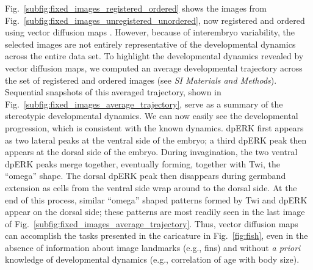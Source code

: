 \documentclass{pnastwo}
\newcommand{\SI}[0]{{\it SI Materials and Methods}}
\newcommand{\fig}[0]{Fig.}
\begin{document}
\begin{article}
\fig~\ref{subfig:fixed_images_registered_ordered} shows the images from \fig~\ref{subfig:fixed_images_unregistered_unordered}, now registered and ordered using vector diffusion maps \cite{singer2012vector}.
%
However, because of interembryo variability, the selected images are not entirely representative of the developmental dynamics across the entire data set.
%
To highlight the developmental dynamics revealed by vector diffusion maps, we computed an average developmental trajectory across the set of registered and ordered images (see \SI). 
%
Sequential snapshots of this averaged trajectory, shown in \fig~\ref{subfig:fixed_images_average_trajectory}, serve as a summary of the stereotypic developmental dynamics.
%
We can now easily see the developmental progression, which is consistent with the known dynamics. 
%
dpERK first appears as two lateral peaks at the ventral side of the embryo; a third dpERK peak then appears at the dorsal side of the embryo.
%
During invagination, the two ventral dpERK peaks merge together, eventually forming, together with Twi, the ``omega'' shape.
%
The dorsal dpERK peak then disappears during germband extension as cells from the ventral side wrap around to the dorsal side.
%
At the end of this process, similar ``omega'' shaped patterns formed by Twi and dpERK appear on the dorsal side; these patterns are most readily seen in the last image of \fig~\ref{subfig:fixed_images_average_trajectory}.
%
Thus, vector diffusion maps can accomplish the tasks presented in the caricature in \fig~\ref{fig:fish}, even in the absence of information about image landmarks (e.g., fins) and without {\it a priori} knowledge of developmental dynamics (e.g., correlation of age with body size).


\end{article}
\end{document}
